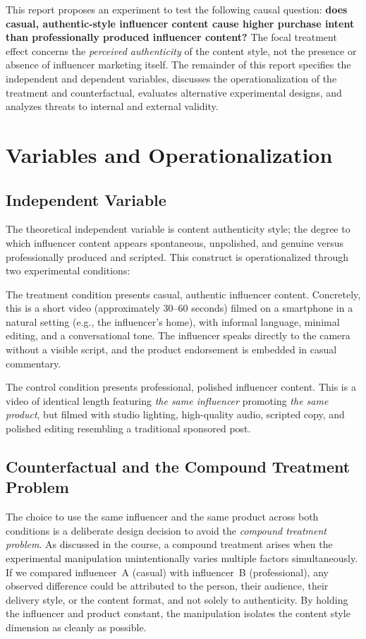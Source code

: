 \documentclass[10pt]{article}
\begin{document}
This report proposes an experiment to test the following causal question: \textbf{does casual, authentic-style influencer content cause higher purchase intent than professionally produced influencer content?} The focal treatment effect concerns the \textit{perceived authenticity} of the content style, not the presence or absence of influencer marketing itself. The remainder of this report specifies the independent and dependent variables, discusses the operationalization of the treatment and counterfactual, evaluates alternative experimental designs, and analyzes threats to internal and external validity.

\section{Variables and Operationalization}

\subsection{Independent Variable}

The theoretical independent variable is content authenticity style; the degree to which influencer content appears spontaneous, unpolished, and genuine versus professionally produced and scripted. This construct is operationalized through two experimental conditions:

The treatment condition presents casual, authentic influencer content. Concretely, this is a short video (approximately 30--60 seconds) filmed on a smartphone in a natural setting (e.g., the influencer's home), with informal language, minimal editing, and a conversational tone. The influencer speaks directly to the camera without a visible script, and the product endorsement is embedded in casual commentary.

The control condition presents professional, polished influencer content. This is a video of identical length featuring \textit{the same influencer} promoting \textit{the same product}, but filmed with studio lighting, high-quality audio, scripted copy, and polished editing resembling a traditional sponsored post.

\subsection{Counterfactual and the Compound Treatment Problem}

The choice to use the same influencer and the same product across both conditions is a deliberate design decision to avoid the \textit{compound treatment problem}. As discussed in the course, a compound treatment arises when the experimental manipulation unintentionally varies multiple factors simultaneously. If we compared influencer~A (casual) with influencer~B (professional), any observed difference could be attributed to the person, their audience, their delivery style, or the content format, and not solely to authenticity. By holding the influencer and product constant, the manipulation isolates the content style dimension as cleanly as possible.
\end{document}
